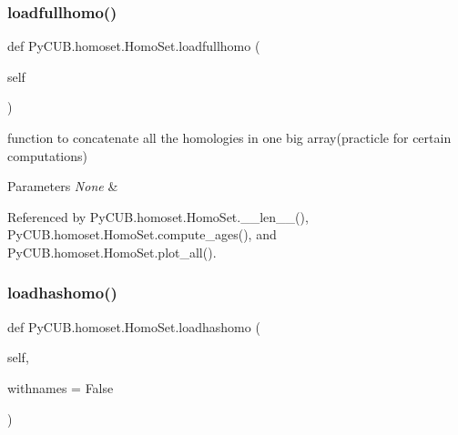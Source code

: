 \mbox{\label{class_py_c_u_b_1_1homoset_1_1_homo_set_a5029dbdf4e7f61bd38b6273f4fde9ead}} 
\subsubsection{\texorpdfstring{loadfullhomo()}{loadfullhomo()}}
{\footnotesize\ttfamily def Py\+C\+U\+B.\+homoset.\+Homo\+Set.\+loadfullhomo (\begin{DoxyParamCaption}\item[{}]{self }\end{DoxyParamCaption})}



function to concatenate all the homologies in one big array(practicle for certain computations) 


\begin{DoxyParams}{Parameters}
{\em None} & \\
\hline
\end{DoxyParams}


Referenced by Py\+C\+U\+B.\+homoset.\+Homo\+Set.\+\_\+\+\_\+len\+\_\+\+\_\+(), Py\+C\+U\+B.\+homoset.\+Homo\+Set.\+compute\+\_\+ages(), and Py\+C\+U\+B.\+homoset.\+Homo\+Set.\+plot\+\_\+all().

\mbox{\label{class_py_c_u_b_1_1homoset_1_1_homo_set_a5a56a99b5bf87afb418a1bbc5ec1c10b}} 
\subsubsection{\texorpdfstring{loadhashomo()}{loadhashomo()}}
{\footnotesize\ttfamily def Py\+C\+U\+B.\+homoset.\+Homo\+Set.\+loadhashomo (\begin{DoxyParamCaption}\item[{}]{self,  }\item[{}]{withnames = {\ttfamily False} }\end{DoxyParamCaption})}




